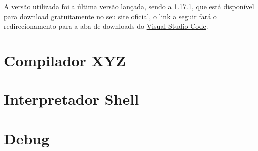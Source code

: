     A versão utilizada foi a última versão lançada, sendo a 1.17.1, que está disponível para download gratuitamente no seu site oficial, o link a seguir fará o redirecionamento para a aba de downloads do \href{https://code.visualstudio.com}{Visual Studio Code}.
    
    \section{Compilador XYZ}


    \section{Interpretador Shell}

   
    \section{Debug}
     